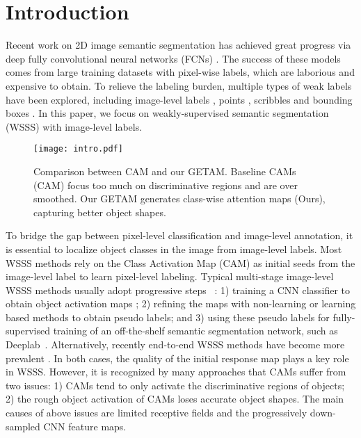\documentclass[10pt,twocolumn,letterpaper]{article}
\begin{document}
\section{Introduction}
Recent work on 2D image semantic segmentation has achieved great progress via
deep fully convolutional neural networks (FCNs) \cite{long2015fully}.
The success of these models \cite{zhao2017pyramid,chen2017deeplab,chen2014semantic,chen2017rethinking} comes from large training datasets with pixel-wise labels, which are laborious and expensive to obtain. 
To relieve the labeling burden, multiple types of weak labels have been explored, including image-level labels \cite{huang2018weakly,ahn2018learning,fan2020cian}, points \cite{bearman2016s},
scribbles \cite{vernaza2017learning,lin2016scribblesup,tang2018regularized} and bounding boxes \cite{dai2015boxsup,papandreou2015weakly,lee2021bbam,oh2021background,sun20203d}.
In this paper, we focus on weakly-supervised semantic segmentation (WSSS) with image-level labels.


\begin{figure}[!t]
   \begin{center}
   {\texttt{[image: intro.pdf]}} 
   \end{center}
\caption{Comparison between CAM and our GETAM.
Baseline CAMs (CAM)
focus too much on discriminative regions and are over smoothed.
Our GETAM generates class-wise attention maps (Ours), capturing better
object shapes.}
\label{fig:intro}
\end{figure}


To bridge the gap between pixel-level classification and image-level annotation, it is essential to localize object classes in the image from image-level labels.
Most WSSS methods rely on the Class Activation Map (CAM) \cite{zhou2016learning} as initial seeds from the image-level label to learn pixel-level labeling. 
Typical multi-stage image-level WSSS methods usually adopt progressive steps ~\cite{wang2020self,chang2020weakly,zhang2020splitting,zhang2020reliability,guo2019mixup,yun2019cutmix,kim2021discriminative}:
1) training a CNN classifier
to obtain object activation maps \cite{zhou2016learning,wang2020self,chang2020weakly,guo2019mixup,kim2021discriminative,hou2018self};
2) refining the maps with non-learning \cite{yao2021non} or learning based methods \cite{ahn2018learning,huang2018weakly}
to obtain pseudo labels; and
3) using these pseudo labels for fully-supervised training of an off-the-shelf semantic segmentation network, such as Deeplab~\cite{chen2017deeplab}.
Alternatively, recently end-to-end WSSS methods have become more prevalent \cite{zhang2020reliability,Araslanov_2020_CVPR,zhang2021adaptive}.
In both cases, the quality of the initial response map plays a key role in WSSS. However, it is recognized by many approaches \cite{wang2020self,chang2020weakly,zhang2020splitting,zhang2020reliability,guo2019mixup,yun2019cutmix,kim2021discriminative,yao2021non,sun2022inferring,wu2021embedded} that CAMs suffer from two issues: 1) CAMs tend to only activate the discriminative regions of objects; 2) the rough object activation of CAMs loses accurate object shapes.
The main causes of above issues are limited receptive fields and the progressively down-sampled CNN feature maps.
\end{document}
